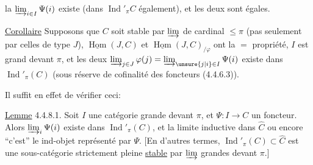 la $\varinjlim_{i\in I}\Psi(i)$ existe (dans $\operatorname{Ind}'_{\pi}C$ également), et les deux sont égales.

\uline{Corollaire}  Supposons que $C$ soit stable par $\varinjlim$ de cardinal $\leq\pi$ (pas seulement par celles de type $J$),  $\underline{\operatorname{Hom}}(J,C)$ et  $\underline{\operatorname{Hom}}(J,C)_{/\varphi}$ ont la $=$ propriété, $I$ est grand devant $\pi$, et les deux $\varinjlim_{j\in J}\varphi(j)=\varinjlim_{\unsure{j|i}\in I}\Psi(i)$ existe dans $\operatorname{Ind}'_{\pi}(C)$ (sous réserve de cofinalité des foncteurs (4.4.6.3)).

Il suffit en effet de vérifier ceci:

\uline{Lemme} 4.4.8.1. Soit $I$ une catégorie grande devant $\pi$, et $\Psi:I\longrightarrow C$ un foncteur. Alors $\varinjlim_i\Psi(i)$ existe dans $\operatorname{Ind}'_{\pi}(C)$, et   la limite inductive dans $\widehat C$  ou encore ``c'est'' le ind-objet  représenté par $\Psi$. [En d'autres termes, $\operatorname{Ind}'_{\pi}(C)\subset\widehat C$ est une sous-catégorie strictement pleine \uline{stable} par $\varinjlim$ grandes devant $\pi$.]
